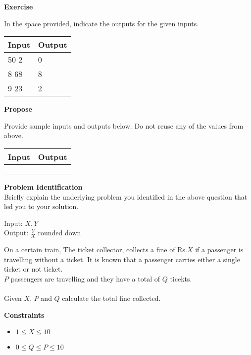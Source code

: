 \documentclass[a4paper]{exam}
\newcommand\heading[1]{\textbf{#1}}
\begin{document}
\begin{questions}
    \heading{Exercise}

    In the space provided, indicate the outputs for the given inputs.

    \begin{tabularx}{\textwidth}{|X|X|}
        \rowcolor{gray!50}
        \hline
        Input & Output \\ \hline\hline
        50 2  & 0      \\\hline
        8 68  & 8      \\\hline
        9 23  & 2      \\\hline
    \end{tabularx}

    \heading{Propose}

    Provide sample inputs and outputs below. Do not reuse any of the values from above.

    \begin{tabularx}{\textwidth}{|X|X|}
        \rowcolor{gray!50}
        \hline
        Input & Output \\ \hline\hline
              &        \\\hline
              &        \\\hline
              &        \\\hline
    \end{tabularx}

    \heading{Problem Identification}\\
    Briefly explain the underlying problem you identified in the above question that led you to your solution.

    \begin{mdframed}
      Input: $X,Y$\\
      Output: $\frac{Y}{X}$ rounded down\\
    \end{mdframed}


    On a certain train, The ticket collector, collects a fine of Rs.$X$ if a passenger is travelling without a ticket. It is known that a passenger carries either a single ticket or not ticket.
    \\
    $P$ passengers are travelling and they have a total of $Q$ ticekts.
    \\\\
    Given $X$, $P$ and $Q$ calculate the total fine collected.


    \heading{Constraints}
    \begin{itemize}
        \item $1 \le X \le 10$
        \item $0 \le Q \le P \le 10$
    \end{itemize}



\end{questions}
\end{document}
